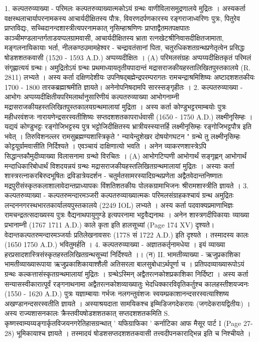 1. कल्पतरुव्याख्या - परिमलः 
कल्पतरुव्याख्यात्मकोऽयं ग्रन्थः वाणीविलासमुद्रणालये मुद्रितः । अस्यकर्ता वक्षस्थलाचार्यापरनामकस्य आचार्यदीक्षितस्य पौत्रः, विवरणदर्पणकारस्य रङ्गराजाध्वरिणः पुत्रः, पितुरेव प्राप्तविद्यः, सच्चिदानन्दशास्त्रीत्यपरनामकात् नृसिम्हाश्रणिणः प्राप्ताद्वैतमतपक्षपातः काञ्चीमण्डलान्तर्गताडयप्पलग्रामवासी, आचार्यदीक्षितस्य भ्राता रत्नखेटश्रीनिवासदीक्षितजामाता, मङ्गलनायिकायाः भर्ता, नीलकण्ठउमामहेश्वर - चन्द्रावतंसानां पिता, चतुरधिकशतग्रन्थप्रणेतृत्वेन प्रसिद्धः षोडशशतकवासी (1520 - 1593 A.D.) अप्पय्यदीक्षितः । 
(A) परिमलसंग्रहः 
अप्पय्यदीक्षितकृतं परिमलं संगृह्णात्ययं ग्रन्थः। अमुद्रितोऽयं ग्रन्थः प्रथमाध्यायतृतीयपादान्तं मद्रासराजकीयहस्तालिखितपुस्तकालये (R. 2811) लभ्यते । अस्य कर्ता दक्षिणदेशीयः उपनिषद्बह्मेन्द्रपरम्परागतः रामचन्द्राश्रमिशिष्यः अष्टादशशतकीयः 1700 - 1800 तारकब्रह्माश्रमीति ज्ञायते। अनेनोपनिषदामपि सारस्सङ्गृहीतः ।
2.  कल्पतरुव्याख्या - आभोगः 
अप्पय्यदीक्षितीयपरिमलार्थानुसारिणीयं कल्पतरुव्याख्या आभोगनाम्नी मद्रासराजकीयहस्तलिखितपुस्तकालयग्रन्थमालायां मुद्रिता । अस्य कर्ता कोण्डुभट्टरमाम्बयोः पुत्रः महीधरवंशजः नारायणेन्द्रसरस्वतीशिष्यः सप्तदशशतकापरार्धवासी (1650 - 1750 A.D.) लक्ष्मीनृसिम्हः । यद्ययं कोण्डुभट्टः रङ्गोजिभट्टस्य पुत्र भट्टोजिदीक्षितस्य भ्रात्रीयस्स्यात्तर्हि लक्ष्मीनृसिम्हः रङ्गोजिभट्टपौत्र इति भवेत् । तिरुविशनल्लर रामसुब्रह्मण्यशास्त्रिकृते " न्यायेन्दुशेखर दोषयोगघटन " ग्रन्थे तु लक्ष्मीनृसिम्हः कोट्टयूर्ग्रामवासीति निर्दिश्यते । एवञ्चायं दाक्षिणात्यो भवति । अनेन व्याकरणशास्त्रेऽपि सिद्धान्तकौमुदीव्याख्या विलासनामा ग्रन्थो विरचितः । 
(A) आभोगटिप्पणी 
आभोगार्थं सङ्गृह्णन् आभोगार्थं मन्दाधिकारिबोधार्थं विशदयन्नयं ग्रन्थः मद्रासराजकीयहस्तलिखितग्रन्थमालायां मुद्रितः । अस्याः कर्ता शास्त्ररत्नाकरबिरुदभूषितः द्रविडात्रेयदर्शन - चतुर्मतसामरस्यादिग्रन्थप्रणेता अद्वैतवेदान्तनिष्णातः मद्रपुरीसंस्कृतकलाशालावेदान्तप्राध्यापकः विंशतिशतकीयः पोलकग्रामाभिजनः श्रीरामशास्त्रीति ज्ञायते । 
3. कल्पतरुव्याख्या - कल्पतरुमन्दारमञ्जरी 
कल्पतरुव्याख्यात्मकः परिमलसंग्राहकश्चायं ग्रन्थ अमुद्रितः लन्दननगरस्थभारतकार्यालयपुस्तकालये (2249 IOL) लभ्यते । अस्य कर्ता पदवाक्यप्रमाणाभिज्ञः रामचन्द्रतत्सदाख्यस्य पुत्रः वैद्यनाथपायुगुण्डे इत्यपरनामा भट्टवैद्यनाथः । अनेन शास्त्रगदीपिकायाः व्याख्या प्रभानाम्नी (1767 1711 A.D.) काले कृता इति हालसूच्यां (Page 174 XV) दृश्यते। वेदान्तकल्पतरुमन्दारमञ्जर्याः प्रतिलेखनावसरः (1778 सं 1722 A.D.) इति दृश्यते । तस्मादस्य कालः (1650 1750 A.D.) भवितुमर्हति ।  
4. कल्पतरुव्याख्या - अज्ञातकर्तृनामधेया । इयं व्याख्या हरप्रसादशास्त्रिसंस्कृतहस्तलिखितग्रन्थसूच्यां निर्दिश्यते ।। 
(न) II. भामतीव्याख्या - ऋजुप्रकाशिका 
भामतीव्याख्यारूपाया ऋजुप्रकाशिकायाश्शैली अतिसरला बालसुबोधाऽर्थपूर्णा च । प्रतिपदव्याख्यारूपोऽयं ग्रन्थः कल्कत्तासंस्कृतग्रन्थमालायां मुद्रितः । ग्रन्थेऽस्मिन् अद्वैतरत्नकोशप्रकाशिका निर्दिष्टा । अस्य कर्ता सन्यासस्वीकारात्पूर्वं रङ्गनाथनामा अद्वैतरत्नकोशव्याख्यातुः भेदधिक्कारविवृतिकर्तुश्च कालहस्तीशयज्वनः (1550 - 1620 A.D.) पुत्रः यज्ञाम्बायाः गर्भजः नलगन्तुवंशजः स्वयम्प्रकाशानन्दसरस्वत्याश्शिष्य अखण्डानन्दसरस्वतीति ज्ञायते । अस्याश्रयदाता सामयिकश्च इम्मिडिजगदेकरायः (जगदेकरायद्वितीयः) । अस्य राज्यशासनकालः क्रैस्तवीयषोडशशतकात् सप्तदशशतकमिति S. कृष्णस्वाम्यय्यङ्गार्कृतविजयनगरेतिहासग्रन्थात्  ' यफिग्राफिका ' कर्नाटिका आफ मैसूर पार्ट I (Page 27-28) भूमिकायाश्च ज्ञायते । तस्मादयं षोडशसप्तदशशतकवासी तत्त्वदीपनकाराद्भिन्न इति च निश्चीयते । 
